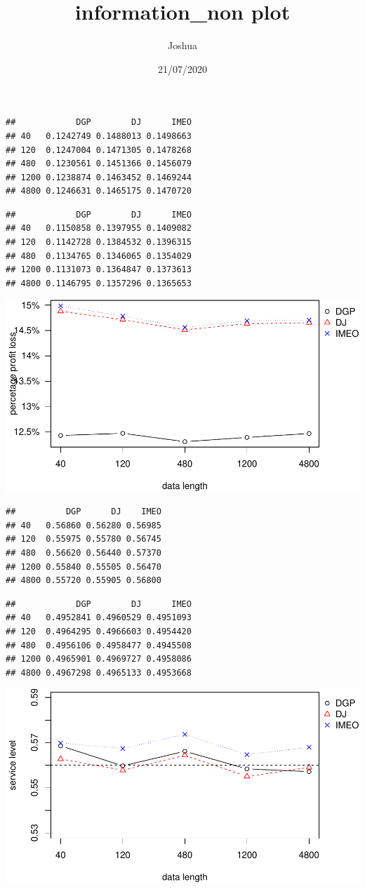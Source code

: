 \documentclass[
]{article}
\title{information\_non plot}
\author{Joshua}
\date{21/07/2020}
\begin{document}
\maketitle

\begin{verbatim}
##            DGP        DJ      IMEO
## 40   0.1242749 0.1488013 0.1498663
## 120  0.1247004 0.1471305 0.1478268
## 480  0.1230561 0.1451366 0.1456079
## 1200 0.1238874 0.1463452 0.1469244
## 4800 0.1246631 0.1465175 0.1470720
\end{verbatim}

\begin{verbatim}
##            DGP        DJ      IMEO
## 40   0.1150858 0.1397955 0.1409082
## 120  0.1142728 0.1384532 0.1396315
## 480  0.1134765 0.1346065 0.1354029
## 1200 0.1131073 0.1364847 0.1373613
## 4800 0.1146795 0.1357296 0.1365653
\end{verbatim}

\includegraphics{information_non-plot_files/figure-latex/AR(1)ppl-1.pdf}

\begin{verbatim}
##          DGP      DJ    IMEO
## 40   0.56860 0.56280 0.56985
## 120  0.55975 0.55780 0.56745
## 480  0.56620 0.56440 0.57370
## 1200 0.55840 0.55505 0.56470
## 4800 0.55720 0.55905 0.56800
\end{verbatim}

\begin{verbatim}
##            DGP        DJ      IMEO
## 40   0.4952841 0.4960529 0.4951093
## 120  0.4964295 0.4966603 0.4954420
## 480  0.4956106 0.4958477 0.4945508
## 1200 0.4965901 0.4969727 0.4958086
## 4800 0.4967298 0.4965133 0.4953668
\end{verbatim}

\includegraphics{information_non-plot_files/figure-latex/AR(1)sl-1.pdf}
\end{document}
